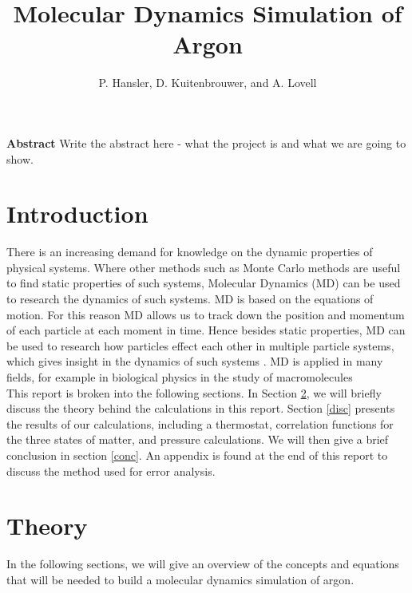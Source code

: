 \documentclass{article}
\begin{document}
\title{Molecular Dynamics Simulation of Argon}
\author{P. Hansler, D. Kuitenbrouwer, and A. Lovell}
\maketitle

\begin{center}
\textbf{Abstract}  Write the abstract here - what the project is and what we are going to show.  \\
\end{center}

\begin{multicols}{2}

\section{Introduction}

There is an increasing demand for knowledge on the dynamic properties of physical systems. Where other methods such as Monte Carlo methods are useful to find static properties of such systems, Molecular Dynamics (MD) can be used to research the dynamics of such systems. MD is based on the equations of motion. For this reason MD allows us to track down the position and momentum of each particle at each moment in time. Hence besides static properties, MD can be used to research how particles effect each other in multiple particle systems, which gives insight in the dynamics of such systems \cite{thijssen}. MD is applied in many fields, for example in biological physics in the study of macromolecules \cite{deGroot} \\

This report is broken into the following sections.  In Section \ref{theory}, we will briefly discuss the theory behind the calculations in this report.  Section \ref{disc} presents the results of our calculations, including a thermostat, correlation functions for the three states of matter, and pressure calculations.  We will then give a brief conclusion in section \ref{conc}.  An appendix is found at the end of this report to discuss the method used for error analysis.  

\section{Theory}
\label{theory}

In the following sections, we will give an overview of the concepts and equations that will be needed to build a molecular dynamics simulation of argon.


\end{multicols}
\end{document}
